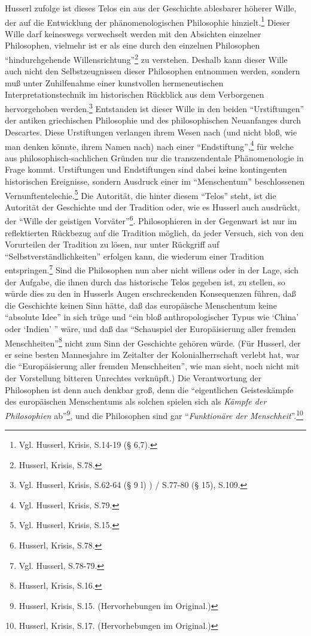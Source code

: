 Husserl zufolge ist dieses Telos ein aus der Geschichte ablesbarer höherer
Wille, der auf die Entwicklung der phänomenologischen Philosophie
hinzielt.\footnote{Vgl. Husserl, Krisis, S.14-19 (§ 6,7).} Dieser Wille darf
keineswegs verwechselt werden mit den Absichten einzelner Philosophen,
vielmehr ist er als eine durch den einzelnen Philosophen "`hindurchgehende
Willensrichtung"'\footnote{Husserl, Krisis, S.78.} zu verstehen.  Deshalb kann
dieser Wille auch nicht den Selbstzeugnissen dieser Philosophen entnommen
werden, sondern muß unter Zuhilfenahme einer kunstvollen hermeneutischen
Interpretationstechnik im historischen Rückblick aus dem Verborgenen
hervorgehoben werden.\footnote{Vgl. Husserl, Krisis, S.62-64 (§ 9 l) ) /
  S.77-80 (§ 15), S.109.}  Entstanden ist dieser Wille in den beiden
"`Urstiftungen"' der antiken griechischen Philosophie und des philosophischen
Neuanfanges durch Descartes.  Diese Urstiftungen verlangen ihrem Wesen nach
(und nicht bloß, wie man denken könnte, ihrem Namen nach) nach einer
"`Endstiftung"',\footnote{Vgl.  Husserl, Krisis, S.79.} für welche aus
philosophisch-sachlichen Gründen nur die transzendentale Phänomenologie in
Frage kommt. Urstiftungen und Endstiftungen sind dabei keine kontingenten
historischen Ereignisse, sondern Ausdruck einer im "`Menschentum"'
beschlossenen Vernunftentelechie.\footnote{Vgl. Husserl, Krisis, S.15.} Die
Autorität, die hinter diesem "`Telos"' steht, ist die Autorität der Geschichte
und der Tradition oder, wie es Husserl auch ausdrückt, der "`Wille der
geistigen Vorväter"'\footnote{Husserl, Krisis, S.78.}. Philosophieren in der
Gegenwart ist nur im reflektierten Rückbezug auf die Tradition möglich, da
jeder Versuch, sich von den Vorurteilen der Tradition zu lösen, nur unter
Rückgriff auf "`Selbstverständlichkeiten"' erfolgen kann, die wiederum einer
Tradition entspringen.\footnote{Vgl. Husserl, S.78-79.} Sind die Philosophen
nun aber nicht willens oder in der Lage, sich der Aufgabe, die ihnen durch das
historische Telos gegeben ist, zu stellen, so würde dies zu den in Husserls
Augen erschreckenden Konsequenzen führen, daß die Geschichte keinen Sinn
hätte, daß das europäische Menschentum keine "`absolute Idee"' in sich trüge
und "`ein bloß anthropologischer Typus wie `China' oder `Indien' "' wäre, und
daß das "`Schauspiel der Europäisierung aller fremden
Menschheiten"'\footnote{Husserl, Krisis, S.16.} nicht zum Sinn der Geschichte
gehören würde. (Für Husserl, der er seine besten Mannesjahre im Zeitalter der
Kolonialherrschaft verlebt hat, war die "`Europäisierung aller fremden
Menschheiten"', wie man sieht, noch nicht mit der Vorstellung bitteren
Unrechtes verknüpft.) Die Verantwortung der Philosophen ist denn auch denkbar
groß, denn die "`eigentlichen Geisteskämpfe des europäischen Menschentums als
solchen spielen sich als {\it Kämpfe der Philosophien} ab"'\footnote{Husserl,
  Krisis, S.15. (Hervorhebungen im Original.)}, und die Philosophen sind gar
"`{\it Funktionäre der Menschheit}"'.\footnote{Husserl, Krisis, S.17.
  (Hervorhebungen im Original.)}

